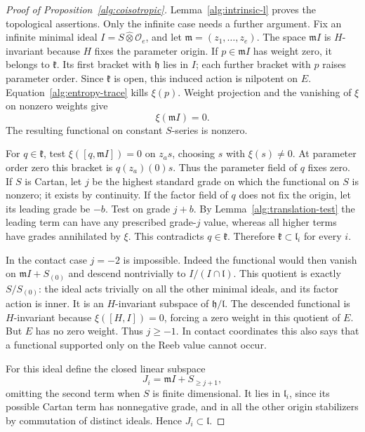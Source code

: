 \begin{proof}[Proof of Proposition~\ref{alg:coisotropic}]
Lemma~\ref{alg:intrinsic-l} proves the topological assertions.
Only the infinite case needs a further argument. Fix an infinite minimal
ideal $I=S\widehat\otimes\mathcal O_e$, and let
$\mathfrak m=(z_1,\ldots,z_e)$. The space $\mathfrak m I$ is
$H$-invariant because $H$ fixes the parameter origin. If
$p\in\mathfrak m I$ has weight zero, it belongs to
$\mathfrak k$. Its first bracket with $\mathfrak h$ lies in $I$;
each further bracket with $p$ raises parameter order. Since
$\mathfrak k$ is open, this induced action is nilpotent on $E$.
Equation~\eqref{alg:entropy-trace} kills $\xi(p)$. Weight projection
and the vanishing of $\xi$ on nonzero weights give
\begin{equation}
 \xi(\mathfrak m I)=0.
 \label{alg:parameter-annihilation}
\end{equation}
The resulting functional on constant $S$-series is nonzero.

For $q\in\mathfrak k$, test $\xi([q,\mathfrak m I])=0$ on
$z_a s$, choosing $s$ with $\xi(s)\ne0$. At parameter order zero
this bracket is $q(z_a)(0)s$. Thus the parameter field of $q$ fixes
zero. If $S$ is Cartan, let $j$ be the highest standard grade on
which the functional on $S$ is nonzero; it exists by continuity.
If the factor field of $q$ does not fix the origin, let its leading
grade be $-b$. Test on grade $j+b$. By
Lemma~\ref{alg:translation-test} the leading term can have any
prescribed grade-$j$ value, whereas all higher terms have grades
annihilated by $\xi$. This contradicts $q\in\mathfrak k$.
Therefore $\mathfrak k\subset\mathfrak l_i$ for every $i$.

In the contact case $j=-2$ is impossible. Indeed the functional would
then vanish on $\mathfrak m I+S_{(0)}$ and descend nontrivially to
$I/(I\cap\mathfrak l)$. This quotient is exactly
$S/S_{(0)}$: the ideal acts trivially on all the other minimal
ideals, and its factor action is inner. It is an $H$-invariant
subspace of $\mathfrak h/\mathfrak l$. The descended functional is
$H$-invariant because $\xi([H,I])=0$, forcing a zero weight in this
quotient of $E$. But $E$ has no zero weight. Thus $j\ge-1$. In contact
coordinates this also says that a functional supported only on the
Reeb value cannot occur.

For this ideal define the closed linear subspace
\[
 J_i=\mathfrak m I+S_{\ge j+1},
\]
omitting the second term when $S$ is finite dimensional. It lies in
$\mathfrak l_i$, since its possible Cartan term has nonnegative
grade, and in all the other origin stabilizers by commutation of
distinct ideals. Hence $J_i\subset\mathfrak l$.


\end{proof}
